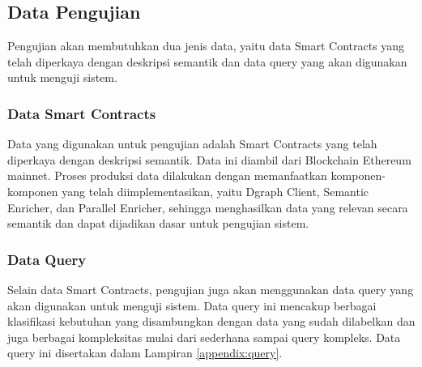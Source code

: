 \subsection{Data Pengujian}

Pengujian akan membutuhkan dua jenis data, yaitu data Smart Contracts yang telah diperkaya dengan deskripsi semantik dan data query yang akan digunakan untuk menguji sistem.

\subsubsection{Data Smart Contracts}

Data yang digunakan untuk pengujian adalah Smart Contracts yang telah diperkaya dengan deskripsi semantik. Data ini diambil dari Blockchain Ethereum mainnet. Proses produksi data dilakukan dengan memanfaatkan komponen-komponen yang telah diimplementasikan, yaitu Dgraph Client, Semantic Enricher, dan Parallel Enricher, sehingga menghasilkan data yang relevan secara semantik dan dapat dijadikan dasar untuk pengujian sistem.

\subsubsection{Data Query}

Selain data Smart Contracts, pengujian juga akan menggunakan data query yang akan digunakan untuk menguji sistem. Data query ini mencakup berbagai klasifikasi kebutuhan yang disambungkan dengan data yang sudah dilabelkan dan juga berbagai kompleksitas mulai dari sederhana sampai query kompleks. Data query ini disertakan dalam Lampiran \ref{appendix:query}.